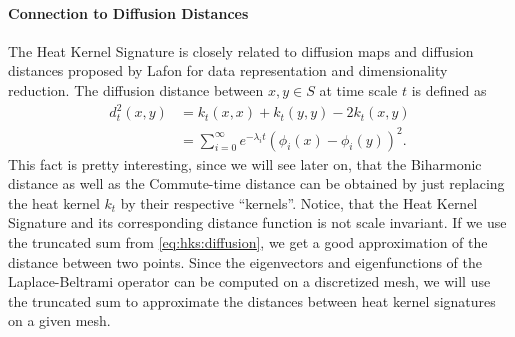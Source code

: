 \paragraph{Connection to Diffusion Distances}
The Heat Kernel Signature is closely related to diffusion maps and diffusion distances proposed by Lafon \cite{lafon2004diffusion} for data representation and dimensionality reduction.
The diffusion distance between $x,y \in S$ at time scale $t$ is defined as
\begin{equation}
	\begin{split}
		d_t^2(x,y) & = k_t(x,x) + k_t(y,y) - 2k_t(x,y) \\
		& = \sum_{i=0}^{\infty} e^{-\lambda_i t} (\phi_i(x) - \phi_i(y))^2.
	\end{split}
	\label{eq:hks:diffusion}
\end{equation}
This fact is pretty interesting, since we will see later on, that the Biharmonic distance as well as the Commute-time distance can be obtained by just replacing the heat kernel $k_t$ by their respective ``kernels''.
Notice, that the Heat Kernel Signature and its corresponding distance function is not scale invariant.
If we use the truncated sum from \eqref{eq:hks:diffusion}, we get a good approximation of the distance between two points.
Since the eigenvectors and eigenfunctions of the Laplace-Beltrami operator can be computed on a discretized mesh, we will use the truncated sum to approximate the distances between heat kernel signatures on a given mesh.

